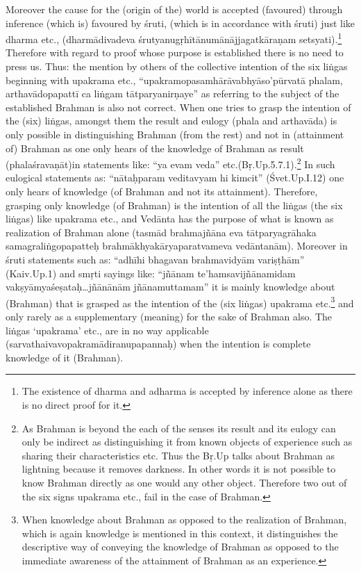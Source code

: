 Moreover the cause for the (origin of the) world is accepted (favoured) through inference (which is) favoured by śruti, (which is in accordance with śruti) just like dharma etc., (dharmādivadeva śrutyanugṛhītānu\-mānājjagatkāraṇam setsyati).\footnote{The existence of dharma and adharma is accepted by inference alone as there is no direct proof for it.} Therefore with regard to proof whose purpose is established there is no need to press us. Thus: the mention by others of the collective intention of the six liṅgas beginning with upakrama etc., “upakramopasamhārāvabhyāso’pūrvatā phalam, arthavādopapattī ca liṅgam tātparyanirṇaye” as referring to the subject of the established Brahman is also not correct. When one tries to grasp the intention of the (six) liṅgas, amongst them the result and eulogy (phala and arthavāda) is only possible in distinguishing Brahman (from the rest) and not in (attainment of) Brahman as one only hears of the knowledge of Brahman as result (phalaśravaṇāt)in statements like: “ya evam veda” etc.(Bṛ.Up.5.7.1).\footnote{As Brahman is beyond the each of the senses its result and its eulogy can only be indirect as distinguishing it from known objects of experience such as sharing their characteristics etc. Thus the Bṛ.Up talks about Brahman as lightning because it removes darkness. In other words it is not possible to know Brahman directly as one would any other object. Therefore two out of the six signs upakrama etc., fail in the case of Brahman.} In such eulogical statements as: “nātaḥparam veditavyam hi kimcit” (Śvet.Up.I.12) one only hears of knowledge (of Brahman and not its attainment). Therefore, grasping only knowledge (of Brahman) is the intention of all the liṅgas (the six liṅgas) like upakrama etc., and Vedānta has the purpose of what is known as realization of Brahman alone (tasmād brahmajñāna eva tātparyagrāhaka samagraliṅgopapatteḥ brahmākhyakāryaparatvameva vedāntanām). Moreover in śruti statements such as: “adhīhi bhagavan brahmavidyām variṣṭhām” (Kaiv.Up.1) and smṛti sayings like: “jñānam te’hamsavijñānamidam vakṣyāmyaśeṣataḥ…jñānānām jñānamuttamam” it is mainly knowledge about (Brahman) that is grasped as the intention of the (six liṅgas) upakrama etc.\footnote{When knowledge about Brahman as opposed to the realization of Brahman, which is again knowledge is mentioned in this context, it distinguishes the descriptive way of conveying the knowledge of Brahman as opposed to the immediate awareness of the attainment of Brahman as an experience.} and only rarely as a supplementary (meaning) for the sake of Brahman also. The liṅgas ‘upakrama’ etc., are in no way applicable  (sarvathaivavopakramādiranupapannaḥ) when the intention is  complete knowledge of it (Brahman).

